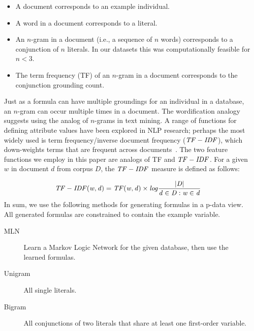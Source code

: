 	\begin{itemize}
		\item A document corresponds to an example individual. 
		\item A  word in a document corresponds to a literal.
		\item An $n$-gram in a document (i.e., a sequence of $n$ words) corresponds to a conjunction of $n$ literals. In our datasets this was computationally feasible for $n<3$.
		\item The term frequency (TF) of an $n$-gram in  a document corresponds to the conjunction grounding count.
	\end{itemize}
	
	Just as a formula can have multiple groundings for an individual in a database, an $n$-gram can occur multiple times in a document.
	The wordification analogy suggests using the analog of $n$-grams in text mining. 
	A range of functions for defining attribute values have been explored in NLP research; perhaps the most widely used is term frequency/inverse document frequency ($\it{TF-IDF}$), which down-weights terms that are frequent across documents~\cite{Lavrac13}.  The two feature functions we employ in this paper are analogs of TF and $\it{TF-IDF}$.  %
	For a given $w$ in document $d$ from corpus $D$, the $\it{TF-IDF}$ measure is defined as follows:
	
	\begin{equation}
	\it{TF-IDF}(w,d)=\it{TF}(w,d)\times log\frac{|D|}{{d\in D : w \in d}}
	\end{equation}
	In sum, we use the following methods for generating formulas in a p-\iid data view. All generated formulas are constrained to contain the example variable. 
	
	\begin{description}
		\item[MLN] Learn a Markov Logic Network for the given database, then use the learned formulas.
		\item[Unigram]  All single literals.
		\item[Bigram] All conjunctions of two literals that share at least one first-order variable.
	\end{description}
	
